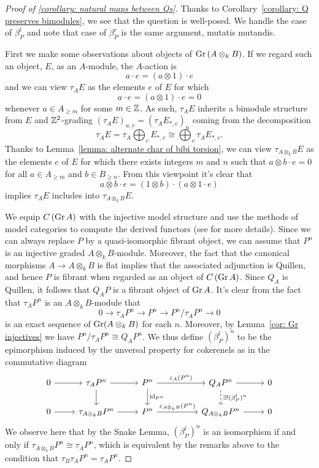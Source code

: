 \begin{proof}[Proof of {\ref{corollary: natural maps between Qs}}]
  Thanks to Corollary~\ref{corollary: Q preserves bimodules}, we see that the question is well-posed. We handle the case of \(\beta^l_P\) and note that case of \(\beta^r_P\) is the same argument, mutatis mutandis.

  First we make some observations about objects of \(\operatorname{Gr}\left(A \otimes_k B\right)\).
  If we regard such an object, \(E\), as an \(A\)-module, the \(A\)-action is
  \[a \cdot e = (a \otimes 1) \cdot e\]
  and we can view \(\tau_A E\) as the elements \(e\) of \(E\) for which
  \[a \cdot e = (a \otimes 1) \cdot e = 0\]
  whenever \(a \in A_{\geq m}\) for some \(m \in \mathbb{Z}\).
  As such, \(\tau_A E\) inherits a bimodule structure from \(E\) and \(\mathbb{Z}^2\)-grading \((\tau_A E)_{u,v} = (\tau_A E_{*,v})_u\) coming from the decomposition
  \[\tau_A E = \tau_A \bigoplus_v E_{\ast,v} \cong \bigoplus_v \tau_A E_{\ast,v}.\]
  Thanks to Lemma~\ref{lemma: alternate char of bibi torsion}, we can view \(\tau_{A \otimes_k B} E\) as the elements \(e\) of \(E\) for which there exists integers \(m\) and \(n\) such that \(a \otimes b \cdot e = 0\) for all \(a \in A_{\geq m}\) and \(b \in B_{\geq n}\).
  From this viewpoint it's clear that
  \[a \otimes b \cdot e = (1 \otimes b) \cdot (a \otimes 1 \cdot e)\]
  implies \(\tau_A E\) includes into \(\tau_{A \otimes_k B} E\).

  We equip \(C\left(\operatorname{Gr}A\right)\) with the injective model structure and use the methods of model categories to compute the derived functors (see \parencite{Hovey01} for more details).
  Since we can always replace \(P\) by a quasi-isomorphic fibrant object, we can assume that \(P^n\) is an injective graded \(A \otimes_k B\)-module.
  Moreover, the fact that the canonical morphisms \(A \to A \otimes_k B\) is flat implies that the associated adjunction is Quillen, and hence \(P\) is fibrant when regarded as an object of  \(C\left(\operatorname{Gr}A\right)\).
  Since \(Q_A\) is Quillen, it follows that \(Q_A P\) is a fibrant object of \(\operatorname{Gr}A\).
  It's clear from the fact that \(\tau_A P^n\) is an \(A \otimes_k B\)-module that   \[0 \to \tau_A P^n \to P^n \to P^n/\tau_A P^n \to 0\]
  is an exact sequence of \(\operatorname{Gr}(A \otimes_k B)\) for each \(n\).
  Moreover, by Lemma~\ref{cor: Gr injectives} we have \(P^n/\tau_A P^n \cong Q_A P^n\).
  We thus define \((\beta^l_P)^n\) to be the epimorphism induced by the unversal property for cokerenels as in the commutative diagram
  \[\begin{tikzcd}
  0 \arrow{r} & \tau_{A} P^n \arrow{d}\arrow{r} & P^n \arrow{d}{\id_{P^n}}\arrow{rr}{\varepsilon_{A}(P^n)} && Q_{A} P^n \arrow{r}\arrow[dashed]{d}{\exists ! (\beta^l_P)^n} & 0\\
  0 \arrow{r} & \tau_{A \otimes_k B} P^n \arrow{r} & P^n\arrow{rr}{\varepsilon_{A \otimes_k B}(P^n)} && Q_{A \otimes_k B} P^n \arrow{r} & 0 
  \end{tikzcd}\]  We observe here that by the Snake Lemma, \((\beta^l_P)^n\) is an isomorphism if and only if \(\tau_{A \otimes_k B} P^n \cong \tau_A P^n\), which is equivalent by the remarks above to the condition that \(\tau_B \tau_A P^n = \tau_A P^n\).


\end{proof}
